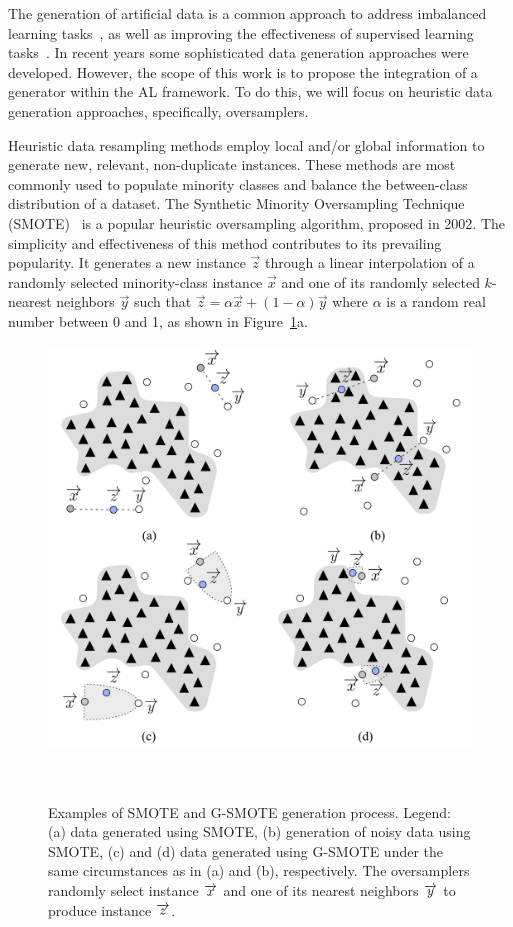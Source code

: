 \documentclass[preprint,12pt]{elsarticle}
\begin{document}
The generation of artificial data is a common approach to address imbalanced
learning tasks~\cite{Kaur2019}, as well as improving the effectiveness of
supervised learning tasks~\cite{DeVries2017}. In recent years some
sophisticated data generation approaches were developed. However, the scope of
this work is to propose the integration of a generator within the AL
framework. To do this, we will focus on heuristic data generation approaches,
specifically, oversamplers.

Heuristic data resampling methods employ local and/or global information to
generate new, relevant, non-duplicate instances. These methods are most
commonly used to populate minority classes and balance the between-class
distribution of a dataset. The Synthetic Minority Oversampling Technique
(SMOTE)~\cite{Chawla2002} is a popular heuristic oversampling
algorithm, proposed in 2002. The simplicity and effectiveness of this method
contributes to its prevailing popularity. It generates a new instance
$\overrightarrow{z}$ through a linear interpolation of a randomly selected
minority-class instance $\overrightarrow{x}$ and one of its randomly
selected $k$-nearest neighbors $\overrightarrow{y}$ such that
$\overrightarrow{z} = \alpha\overrightarrow{x} + (1-\alpha)\overrightarrow{y}$
where $\alpha$ is a random real number between 0 and 1, as shown in
Figure~\ref{fig:data_generation}a. 

\begin{figure}[htb]
	\centering
	\includegraphics[width=.75\linewidth]{../analysis/data_generation}
    \caption{Examples of SMOTE and G-SMOTE generation process. Legend: (a)
        data generated using SMOTE, (b) generation of noisy data using SMOTE,
        (c) and (d) data generated using G-SMOTE under the same circumstances
        as in (a) and (b), respectively. The oversamplers randomly select
        instance $\protect\overrightarrow{x}$ and one of its nearest neighbors
        $\protect\overrightarrow{y}$ to produce instance
        $\protect\overrightarrow{z}$.
    }~\label{fig:data_generation}
\end{figure}
\end{document}
